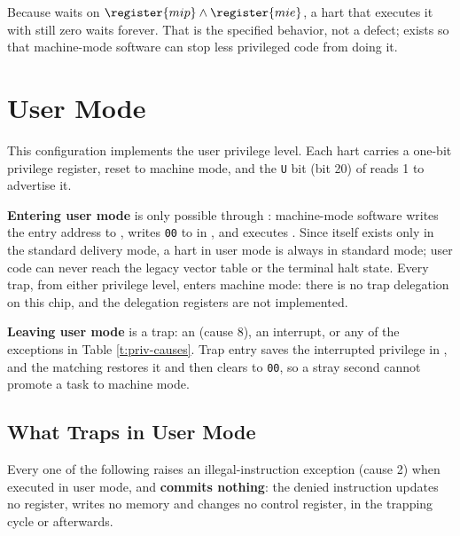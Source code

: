 Because  waits on $\register{mip} \wedge \register{mie}$, a hart that executes it with  still zero waits forever. That is the specified behavior, not a defect;  exists so that machine-mode software can stop less privileged code from doing it.

\fi

\ifprivumode

\section{User Mode} \label{ss:priv-umode}

This configuration implements the user privilege level. Each hart carries a one-bit privilege register, reset to machine mode, and the \texttt{U} bit (bit 20) of  reads 1 to advertise it.

\textbf{Entering user mode} is only possible through : machine-mode software writes the entry address to , writes \texttt{00} to  in , and executes . Since  itself exists only in the standard delivery mode, a hart in user mode is always in standard mode; user code can never reach the legacy vector table or the terminal halt state. Every trap, from either privilege level, enters machine mode: there is no trap delegation on this chip, and the delegation registers are not implemented.

\textbf{Leaving user mode} is a trap: an  (cause 8), an interrupt, or any of the exceptions in Table \ref{t:priv-causes}. Trap entry saves the interrupted privilege in , and the matching  restores it and then clears  to \texttt{00}, so a stray second  cannot promote a task to machine mode.

\subsection{What Traps in User Mode}

Every one of the following raises an illegal-instruction exception (cause 2) when executed in user mode, and \textbf{commits nothing}: the denied instruction updates no register, writes no memory and changes no control register, in the trapping cycle or afterwards.


